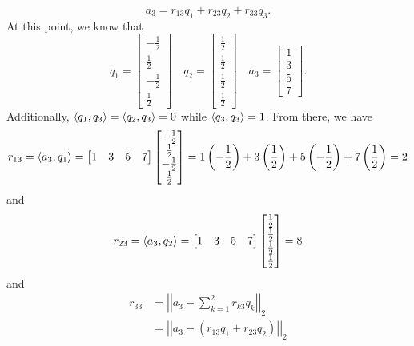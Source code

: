 \documentclass[letterpaper]{article}
\newcommand{\0}{\mathbf{0}}
\begin{document}
\begin{mdframed}
    \begin{mdframed}
        \[a_3 = r_{13} q_1 + r_{23}q_2 + r_{33}q_3.\]
        At this point, we know that 
        \[q_1 = \begin{bmatrix}
            -\frac{1}{2} \\ \frac{1}{2} \\ -\frac{1}{2} \\ \frac{1}{2}
        \end{bmatrix} \quad q_2 = \begin{bmatrix}
            \frac{1}{2} \\ \frac{1}{2} \\ \frac{1}{2} \\ \frac{1}{2}
        \end{bmatrix} \quad a_3 = \begin{bmatrix}
            1 \\ 3 \\ 5 \\ 7
        \end{bmatrix}.\]
        Additionally, $\langle q_1, q_3 \rangle = \langle q_2, q_3 \rangle = 0$ while $\langle q_3, q_3 \rangle = 1$. From there, we have
        \[r_{13} = \langle a_3, q_1 \rangle = \begin{bmatrix}
            1 & 3 & 5 & 7
        \end{bmatrix} \begin{bmatrix}
            -\frac{1}{2} \\ \frac{1}{2} \\ -\frac{1}{2} \\ \frac{1}{2}
        \end{bmatrix} = 1\left(-\frac{1}{2}\right) + 3\left(\frac{1}{2}\right) + 5\left(-\frac{1}{2}\right) + 7\left(\frac{1}{2}\right) = 2\]
        and 
        \[r_{23} = \langle a_3, q_2 \rangle = \begin{bmatrix}
            1 & 3 & 5 & 7
        \end{bmatrix} \begin{bmatrix}
            \frac{1}{2} \\ \frac{1}{2} \\ \frac{1}{2} \\ \frac{1}{2}
        \end{bmatrix} = 8\]
        and 
        \begin{equation*}
            \begin{aligned}
                r_{33} &= \left|\left| a_3 - \sum_{k = 1}^{2} r_{k3} q_k \right|\right|_2 \\ 
                    &= \left|\left| a_3 - (r_{13} q_1 + r_{23} q_2) \right|\right|_2 \\ 

\end{aligned}
\end{equation*}
\end{mdframed}
\end{mdframed}
\end{document}
